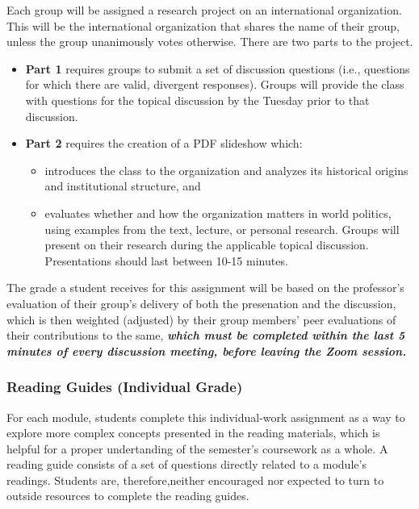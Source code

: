 \documentclass[10pt,]{article}
\providecommand{\tightlist}{%
  \setlength{\itemsep}{0pt}\setlength{\parskip}{0pt}}
\begin{document}
Each group will be assigned a research project on an international
organization. This will be the international organization that shares
the name of their group, unless the group unanimously votes otherwise.
There are two parts to the project.

\begin{itemize}
\tightlist
\item
  \textbf{Part 1} requires groups to submit a set of discussion
  questions (i.e., questions for which there are valid, divergent
  responses). Groups will provide the class with questions for the
  topical discussion by the Tuesday prior to that discussion.
\item
  \textbf{Part 2} requires the creation of a PDF slideshow which:

  \begin{itemize}
  \tightlist
  \item
    introduces the class to the organization and analyzes its historical
    origins and institutional structure, and
  \item
    evaluates whether and how the organization matters in world
    politics, using examples from the text, lecture, or personal
    research. Groups will present on their research during the
    applicable topical discussion. Presentations should last between
    10-15 minutes.
  \end{itemize}
\end{itemize}

The grade a student receives for this assignment will be based on the
professor's evaluation of their group's delivery of both the presenation
and the discussion, which is then weighted (adjusted) by their group
members' peer evaluations of their contributions to the same,
\textbf{\emph{which must be completed within the last 5 minutes of every
discussion meeting, before leaving the Zoom session.}}

\hypertarget{reading-guides-individual-grade}{%
\subsubsection{Reading Guides (Individual
Grade)}\label{reading-guides-individual-grade}}

For each module, students complete this individual-work assignment as a
way to explore more complex concepts presented in the reading materials,
which is helpful for a proper undertanding of the semester's coursework
as a whole. A reading guide consists of a set of questions directly
related to a module's readings. Students are, therefore,neither
encouraged nor expected to turn to outside resources to complete the
reading guides.
\end{document}
